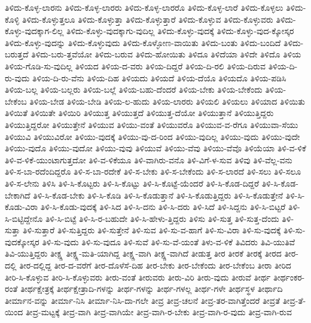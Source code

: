 {ತಿಳಿದು-ಕೊಳ್ಳ-ಲಾರನು
ತಿಳಿದು-ಕೊಳ್ಳ-ಲಾರರು
ತಿಳಿದು-ಕೊಳ್ಳ-ಲಾರರೊ
ತಿಳಿದು-ಕೊಳ್ಳ-ಲಾರೆ
ತಿಳಿದು-ಕೊಳ್ಳಲು
ತಿಳಿದು-ಕೊಳ್ಳಿ
ತಿಳಿದು-ಕೊಳ್ಳುತ್ತಲೂ
ತಿಳಿದು-ಕೊಳ್ಳುತ್ತಾ
ತಿಳಿದು-ಕೊಳ್ಳುತ್ತಾರೆ
ತಿಳಿದು-ಕೊಳ್ಳುವ
ತಿಳಿದು-ಕೊಳ್ಳುವರು
ತಿಳಿದು-ಕೊಳ್ಳು-ವುದಕ್ಕಾಗ-ಲಿಲ್ಲ
ತಿಳಿದು-ಕೊಳ್ಳು-ವುದಕ್ಕಾಗು-ವುದಿಲ್ಲ
ತಿಳಿದು-ಕೊಳ್ಳು-ವುದಕ್ಕೆ
ತಿಳಿದು-ಕೊಳ್ಳು-ವುದ-ಕ್ಕೋಸ್ಕರ
ತಿಳಿದು-ಕೊಳ್ಳು-ವುದನ್ನು
ತಿಳಿದು-ಕೊಳ್ಳುವುದು
ತಿಳಿದು-ಕೊಳ್ಳೋಣ-ವಾಯಿತು
ತಿಳಿದು-ಬಂತು
ತಿಳಿದು-ಬಂದಿದೆ
ತಿಳಿದು-ಬರುತ್ತದೆ
ತಿಳಿದು-ಬರು-ತ್ತವೆಯೋ
ತಿಳಿದು-ಬರುವ
ತಿಳಿದು-ಹೋಯಿತು
ತಿಳಿದೂ
ತಿಳಿದೆಯಾ
ತಿಳಿದೇ
ತಿಳಿದೊ
ತಿಳಿಯ
ತಿಳಿಯ-ಗೊಡಿ-ಸು-ವುದಿಲ್ಲ
ತಿಳಿಯದ
ತಿಳಿಯ-ದ-ವರು
ತಿಳಿಯ-ದಿದ್ದರೆ
ತಿಳಿಯ-ದಿ-ರಲಿ
ತಿಳಿಯ-ದಿರುವ
ತಿಳಿಯ-ದಿ-ರು-ವುದು
ತಿಳಿಯ-ದಿ-ರು-ವೆನು
ತಿಳಿಯ-ದಿಹ
ತಿಳಿಯದು
ತಿಳಿಯದೆ
ತಿಳಿಯ-ದೆಯೊ
ತಿಳಿಯದೊ
ತಿಳಿಯ-ಪಡಿಸಿ
ತಿಳಿಯ-ಬಲ್ಲ
ತಿಳಿಯ-ಬಲ್ಲರು
ತಿಳಿಯ-ಬಲ್ಲೆ
ತಿಳಿಯ-ಬಹು-ದೆಂದರೆ
ತಿಳಿಯ-ಬೇಕು
ತಿಳಿಯ-ಬೇಕೆಂದು
ತಿಳಿಯ-ಬೇಕೆಂಬ
ತಿಳಿಯ-ಬೇಡ
ತಿಳಿಯ-ಬೇಡಿ
ತಿಳಿಯ-ಲ-ಹುದು
ತಿಳಿಯ-ಲಾರರು
ತಿಳಿಯಲಿ
ತಿಳಿಯಲು
ತಿಳಿಯಾದ
ತಿಳಿಯಿತು
ತಿಳಿಯಿತೆ
ತಿಳಿಯಿತೇ
ತಿಳಿಯಿರಿ
ತಿಳಿಯುತ್ತ
ತಿಳಿಯುತ್ತದೆ
ತಿಳಿಯುತ್ತ-ದೆಯೋ
ತಿಳಿಯುತ್ತಾನೆ
ತಿಳಿಯುತ್ತಿದ್ದರು
ತಿಳಿಯುತ್ತಿದ್ದರೋ
ತಿಳಿಯುತ್ತೇನೆ
ತಿಳಿಯುವ
ತಿಳಿಯು-ವಂತೆ
ತಿಳಿಯುವರೊ
ತಿಳಿಯುವ-ವ-ರೆಗೂ
ತಿಳಿಯುವಾ-ಸೆಯು
ತಿಳಿಯುವಿ
ತಿಳಿಯುವಿರೋ
ತಿಳಿಯು-ವುದಕ್ಕೆ
ತಿಳಿಯು-ವು-ದ-ರಿಂದ
ತಿಳಿಯು-ವುದಿಲ್ಲ
ತಿಳಿಯು-ವುದು
ತಿಳಿಯು-ವುದೇ
ತಿಳಿಯು-ವುದೊ
ತಿಳಿಯು-ವುದೋ
ತಿಳಿಯು-ವುವು
ತಿಳಿಯುವೆ
ತಿಳಿಯು-ವೆವು
ತಿಳಿಯು-ವೆವೊ
ತಿಳಿಯೆಯಾ
ತಿಳಿ-ವ-ಳಿಕೆ
ತಿಳಿ-ವ-ಳಿಕೆ-ಯುಂಟಾಗುತ್ತದೋ
ತಿಳಿ-ವ-ಳಿಕೆಯೂ
ತಿಳಿ-ವಾಗಿರು-ವನೊ
ತಿಳಿ-ವಿಗೆ-ಳ-ಸುವ
ತಿಳಿವು
ತಿಳಿ-ವೆಲ್ಲ-ವನು
ತಿಳಿ-ಸ-ಬಾ-ರದೆಂದಿದ್ದರೊ
ತಿಳಿ-ಸ-ಬಾ-ರದೇಕೆ
ತಿಳಿ-ಸ-ಬೇಕು
ತಿಳಿ-ಸ-ಬೇಕೆಂದು
ತಿಳಿ-ಸ-ಲಾರದೆ
ತಿಳಿ-ಸಲು
ತಿಳಿ-ಸಲೂ
ತಿಳಿ-ಸ-ಲೇನು
ತಿಳಿಸಿ
ತಿಳಿ-ಸಿ-ಕೊಟ್ಟರು
ತಿಳಿ-ಸಿ-ಕೊಟ್ಟು
ತಿಳಿ-ಸಿ-ಕೊಟ್ಟೆ-ಯೆಂದರೆ
ತಿಳಿ-ಸಿ-ಕೊಡ-ದಿದ್ದರೆ
ತಿಳಿ-ಸಿ-ಕೊಡ-ಬೇಕಾಗಿದೆ
ತಿಳಿ-ಸಿ-ಕೊಡ-ಬೇಕು
ತಿಳಿ-ಸಿ-ಕೊಡಿ
ತಿಳಿ-ಸಿ-ಕೊಡುತ್ತಾನೆ
ತಿಳಿ-ಸಿ-ಕೊಡುತ್ತಿದ್ದರು
ತಿಳಿ-ಸಿ-ಕೊಡುತ್ತೇನೆ
ತಿಳಿ-ಸಿ-ಕೊಡು-ವಿರಾ
ತಿಳಿ-ಸಿ-ಕೊಡು-ವುದಕ್ಕೆ
ತಿಳಿ-ಸಿದ
ತಿಳಿ-ಸಿ-ದನು
ತಿಳಿ-ಸಿ-ದರು
ತಿಳಿ-ಸಿದೆ
ತಿಳಿ-ಸಿದ್ದನು
ತಿಳಿ-ಸಿ-ಬಿಟ್ಟರೆ
ತಿಳಿ-ಸಿ-ಬಿಟ್ಟಿದ್ದೇನೊ
ತಿಳಿ-ಸಿ-ಬಿಟ್ಟೆ
ತಿಳಿ-ಸಿ-ರ-ಬಹುದೇ
ತಿಳಿ-ಸಿ-ಹೇಳು-ತ್ತಿದ್ದರು
ತಿಳಿಸು
ತಿಳಿ-ಸುತ್ತ
ತಿಳಿ-ಸುತ್ತ-ದೆಂದು
ತಿಳಿ-ಸುತ್ತಾ
ತಿಳಿ-ಸುತ್ತಾರೆ
ತಿಳಿ-ಸುತ್ತಿದ್ದರು
ತಿಳಿ-ಸುತ್ತೇನೆ
ತಿಳಿ-ಸುವ
ತಿಳಿ-ಸು-ವ-ಹಾಗೆ
ತಿಳಿ-ಸು-ವಿರಾ
ತಿಳಿ-ಸು-ವುದಕ್ಕೆ
ತಿಳಿ-ಸು-ವುದಕ್ಕೋಸ್ಕರ
ತಿಳಿ-ಸು-ವುದು
ತಿಳಿ-ಸು-ವುದೂ
ತಿಳಿ-ಸುವೆ
ತಿಳಿ-ಸು-ವೆ-ಯಂತೆ
ತಿಳು-ವ-ಳಿಕೆ
ತಿವಿದರು
ತಿವಿ-ಯುತಿವೆ
ತಿವಿ-ಯುತ್ತಿದ್ದರು
ತೀಕ್ಷ್ಣ
ತೀಕ್ಷ್ಣ-ಮತಿ-ಯಾಗಿದ್ದ
ತೀಕ್ಷ್ಣ-ವಾಗಿ
ತೀಕ್ಷ್ಣ-ವಾಗಿದೆ
ತೀಡುತ್ತ
ತೀರ
ತೀರಕೆ
ತೀರಕ್ಕೆ
ತೀರದ
ತೀರ-ದಲ್ಲಿ
ತೀರ-ದಲ್ಲಿದ್ದ
ತೀರ-ದ-ವರೆಗೆ
ತೀರ-ದೊಳೆಸೆ-ದಿಹ
ತೀರ-ಬೇಕು
ತೀರ-ಬೇಕೆಂದು
ತೀರ-ಬೇಕೆಂಬ
ತೀರಾ
ತೀರಿದ
ತೀರಿ-ಸಿ-ಕೊಳ್ಳುವ
ತೀರಿ-ಸಿ-ಕೊಳ್ಳುವರು
ತೀರು-ವಂತೆ
ತೀರುವರು
ತೀರು-ವಿರಿ
ತೀರು-ವುದು
ತೀರುವೆ
ತೀರ್ಥ
ತೀರ್ಥಂಕರ-ರಂತೆ
ತೀರ್ಥಕ್ಷೇತ್ರಕ್ಕೆ
ತೀರ್ಥಕ್ಷೇತ್ರಾದಿ-ಗಳನ್ನು
ತೀರ್ಥ-ಗಳನ್ನು
ತೀರ್ಥ-ಗಳಲ್ಲ
ತೀರ್ಥ-ಗಳೇ
ತೀರ್ಥಸ್ಥಳ
ತೀರ್ಥಾದಿ
ತೀರ್ಮಾನ-ವನ್ನು
ತೀರ್ಮಾ-ನಿಸಿ
ತೀರ್ಮಾ-ನಿಸಿ-ದಾ-ಗಲೇ
ತೀವ್ರ
ತೀವ್ರ-ಚಲನೆ
ತೀವ್ರ-ತರ-ವಾಗಿತ್ತೆಂದರೆ
ತೀವ್ರತೆ
ತೀವ್ರ-ತೆ-ಯಿಂದ
ತೀವ್ರ-ಮಟ್ಟಕ್ಕೆ
ತೀವ್ರ-ವಾಗಿ
ತೀವ್ರ-ವಾಗಿಯೇ
ತೀವ್ರ-ವಾಗಿ-ರ-ಬೇಕು
ತೀವ್ರ-ವಾಗಿ-ರ-ವುದು
ತೀವ್ರ-ವಾಗಿ-ರುವ
}

